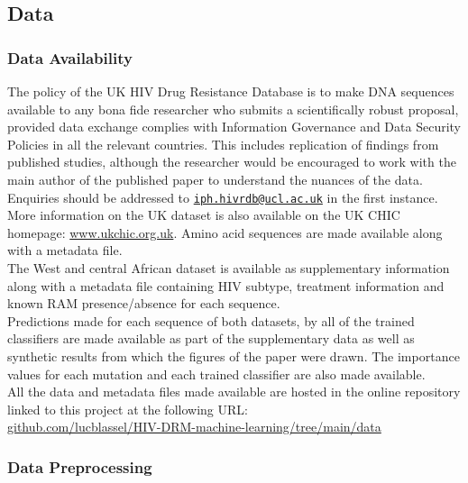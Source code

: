 \documentclass[
  11pt,
  twoside]{scrbook}
\begin{document}
\hypertarget{data-appendix}{%
\subsection{Data}\label{data-appendix}}

\hypertarget{data-availability}{%
\subsubsection{Data Availability}\label{data-availability}}

The policy of the UK HIV Drug Resistance Database is to make DNA sequences available to any bona fide researcher who submits a scientifically robust proposal, provided data exchange complies with Information Governance and Data Security Policies in all the relevant countries. This includes replication of findings from published studies, although the researcher would be encouraged to work with the main author of the published paper to understand the nuances of the data. Enquiries should be addressed to \href{mailto:iph.hivrdb@ucl.ac.uk}{\nolinkurl{iph.hivrdb@ucl.ac.uk}} in the first instance. More information on the UK dataset is also available on the UK CHIC homepage: \href{http://www.ukchic.org.uk/}{www.ukchic.org.uk}. Amino acid sequences are made available along with a metadata file.\\
The West and central African dataset is available as supplementary information along with a metadata file containing HIV subtype, treatment information and known RAM presence/absence for each sequence.\\
Predictions made for each sequence of both datasets, by all of the trained classifiers are made available as part of the supplementary data as well as synthetic results from which the figures of the paper were drawn. The importance values for each mutation and each trained classifier are also made available.\\
All the data and metadata files made available are hosted in the online repository linked to this project at the following URL:\\
\href{https://github.com/lucblassel/HIV-DRM-machine-learning/tree/main/data}{github.com/lucblassel/HIV-DRM-machine-learning/tree/main/data}

\hypertarget{data-preprocessing}{%
\subsubsection{Data Preprocessing}\label{data-preprocessing}}
\end{document}
